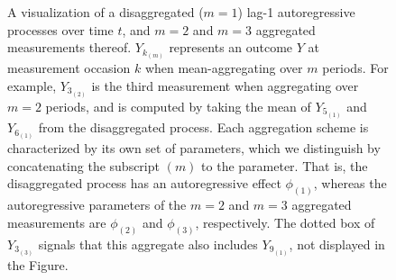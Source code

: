 \documentclass[man]{apa7} %
\begin{document}
\begin{figure}
    \vspace{1cm}
    \caption{A visualization of a disaggregated ($m = 1$) lag-1 autoregressive processes over time $t$, and $m = 2$ and $m = 3$ aggregated measurements thereof. $Y_{k_{(m)}}$ represents an outcome $Y$ at measurement occasion $k$ when mean-aggregating over $m$ periods. For example, $Y_{3_{(2)}}$ is the third measurement when aggregating over $m = 2$ periods, and is computed by taking the mean of $Y_{5_{(1)}}$ and $Y_{6_{(1)}}$ from the disaggregated process. Each aggregation scheme is characterized by its own set of parameters, which we distinguish by concatenating the subscript ${(m)}$ to the parameter. That is, the disaggregated process has an autoregressive effect $\phi_{(1)}$, whereas the autoregressive parameters of the $m = 2$ and $m = 3$ aggregated measurements are $\phi_{(2)}$ and $\phi_{(3)}$, respectively. The dotted box of $Y_{3_{(3)}}$ signals that this aggregate also includes $Y_{9_{(1)}}$, not displayed in the Figure.}
    \label{fig:notation}
\end{figure}
\end{document}
